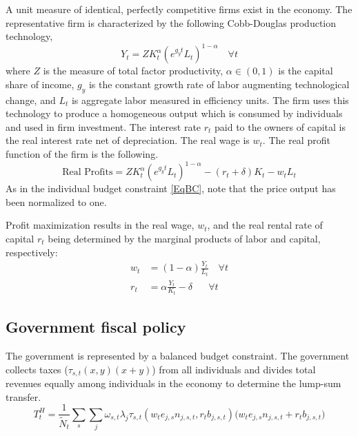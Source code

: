 \documentclass[letterpaper,12pt]{article}
\theoremstyle{definition}
\begin{document}
\begin{spacing}{1.5}
    A unit measure of identical, perfectly competitive firms exist in the economy. The representative firm is characterized by the following Cobb-Douglas production technology,
    \begin{equation}\label{EqCobbDougProd}
       Y_t = Z K_t^\alpha\left(e^{g_y t}L_t\right)^{1-\alpha} \quad \forall t
    \end{equation}
    where $Z$ is the measure of total factor productivity, $\alpha\in(0,1)$ is the capital share of income, $g_y$ is the constant growth rate of labor augmenting technological change, and $L_t$ is aggregate labor measured in efficiency units. The firm uses this technology to produce a homogeneous output which is consumed by individuals and used in firm investment.  The interest rate $r_t$ paid to the owners of capital is the real interest rate net of depreciation. The real wage is $w_t$.  The real profit function of the firm is the following.
    \begin{equation}\label{EqFirmProfit}
       \text{Real Profits} = Z K_t^\alpha\left(e^{g_y t}L_t\right)^{1-\alpha} - (r_t + \delta)K_t - w_t L_t
    \end{equation}
    As in the individual budget constraint \eqref{EqBC}, note that the price output has been normalized to one.

    Profit maximization results in the real wage, $w_t$, and the real rental rate of capital $r_t$ being determined by the marginal products of labor and capital, respectively:
    \begin{align}
       w_t &= (1-\alpha)\frac{Y_t}{L_t} \quad \forall t \label{EqFOCwage}\\
       r_t &= \alpha\frac{Y_t}{K_t} - \delta \quad\:\:\: \forall t \label{EqFOCrate}
    \end{align}


  \subsection{Government fiscal policy}\label{SecGovt}

    The government is represented by a balanced budget constraint. The government collects taxes ($\tau_{s,t}(x,y)(x+y)$) from all individuals and divides total revenues equally among individuals in the economy to determine the lump-sum transfer.
    \begin{equation}\label{EqGovtBC}
      T^H_t = \frac{1}{\tilde N_t} \sum_s \sum_j \omega_{s,t}\lambda_j\tau_{s,t}(w_t e_{j,s}n_{j,s,t}, r_t b_{j,s,t})\bigl(w_t e_{j,s}n_{j,s,t} + r_t b_{j,s,t}\bigr)
    \end{equation}


\end{spacing}
\end{document}
